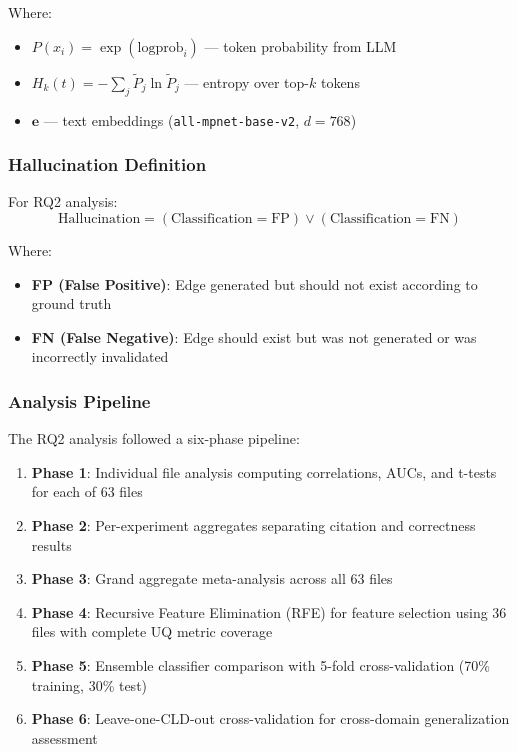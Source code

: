 \documentclass{article}
\begin{document}
\noindent Where:
\begin{itemize}
    \item $P(x_i) = \exp(\text{logprob}_i)$ --- token probability from LLM
    \item $H_k(t) = -\sum_j \tilde{P}_j \ln \tilde{P}_j$ --- entropy over top-$k$ tokens
    \item $\mathbf{e}$ --- text embeddings (\texttt{all-mpnet-base-v2}, $d = 768$)
\end{itemize}

\subsubsection{Hallucination Definition}

For RQ2 analysis:
\begin{equation}
\text{Hallucination} = (\text{Classification} = \text{FP}) \lor (\text{Classification} = \text{FN})
\end{equation}

Where:
\begin{itemize}
    \item \textbf{FP (False Positive)}: Edge generated but should not exist according to ground truth
    \item \textbf{FN (False Negative)}: Edge should exist but was not generated or was incorrectly invalidated
\end{itemize}

\subsubsection{Analysis Pipeline}

The RQ2 analysis followed a six-phase pipeline:

\begin{enumerate}
    \item \textbf{Phase 1}: Individual file analysis computing correlations, AUCs, and t-tests for each of 63 files
    
    \item \textbf{Phase 2}: Per-experiment aggregates separating citation and correctness results
    
    \item \textbf{Phase 3}: Grand aggregate meta-analysis across all 63 files
    
    \item \textbf{Phase 4}: Recursive Feature Elimination (RFE) for feature selection using 36 files with complete UQ metric coverage
    
    \item \textbf{Phase 5}: Ensemble classifier comparison with 5-fold cross-validation (70\% training, 30\% test)
    
    \item \textbf{Phase 6}: Leave-one-CLD-out cross-validation for cross-domain generalization assessment
\end{enumerate}
\end{document}
